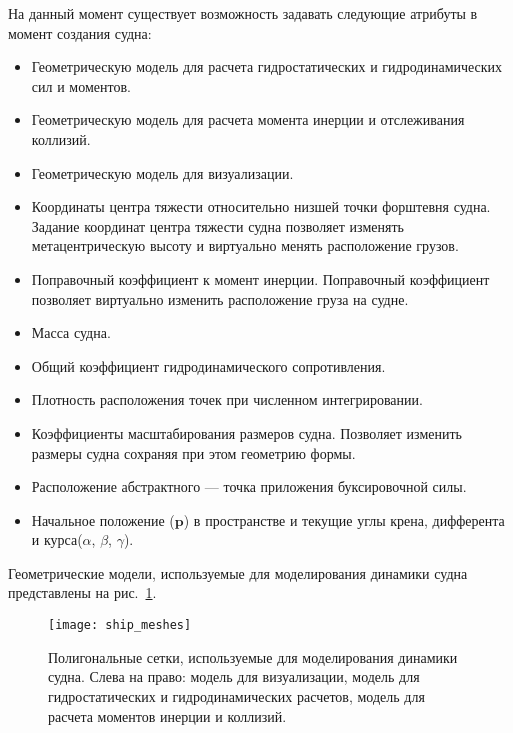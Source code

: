 На данный момент существует возможность задавать следующие атрибуты в момент создания судна:
\begin{itemize}
	\item	Геометрическую модель для расчета гидростатических и гидродинамических сил и моментов.
	\item	Геометрическую модель для расчета момента инерции и отслеживания коллизий.
	\item	Геометрическую модель для визуализации.
	\item	Координаты центра тяжести относительно низшей точки форштевня судна. 
			Задание координат центра тяжести судна позволяет изменять метацентрическую 
			высоту и виртуально менять расположение грузов.
	\item	Поправочный коэффициент к момент инерции. Поправочный коэффициент позволяет 
			виртуально изменить расположение груза на судне.
	\item	Масса судна.
	\item	Общий коэффициент гидродинамического сопротивления.
	\item	Плотность расположения точек при численном интегрировании.
	\item	Коэффициенты масштабирования размеров судна. 
			Позволяет изменить размеры судна сохраняя при этом геометрию формы.
	\item	Расположение абстрактного  --- точка приложения буксировочной силы.
	\item	Начальное положение ($\mathbf{p}$) в пространстве и текущие углы крена, дифферента и курса($\alpha$, $\beta$, $\gamma$).
\end{itemize}

Геометрические модели, используемые для моделирования динамики судна представлены на рис.~\ref{ship_meshes}.

\begin{figure}[ht]
\begin{center}
\texttt{[image: ship\_meshes]}
\end{center}
\caption{Полигональные сетки, используемые для моделирования динамики судна. Слева на право: модель для визуализации, модель для гидростатических и гидродинамических расчетов, модель для расчета моментов инерции и коллизий.}
\label{ship_meshes}
\end{figure}



